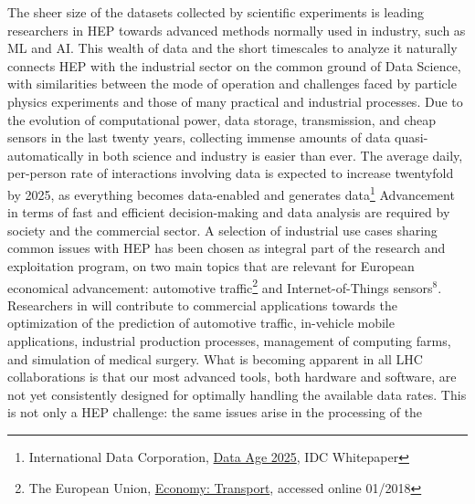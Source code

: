 The sheer size of the datasets collected by
scientific experiments is leading researchers in HEP towards advanced methods normally used in industry,
such as ML and AI. This wealth of data and the short timescales to analyze it
naturally connects HEP with the industrial sector 
on the common ground of Data Science, with similarities between the mode of operation and challenges faced by 
particle physics experiments and those of many practical and industrial processes. 
Due to the evolution of computational power, data storage, transmission, and cheap
sensors in the last twenty years, collecting immense amounts of data
quasi-automatically in both science and industry is easier than ever. 
The average daily, per-person rate of interactions involving data is 
expected to increase twentyfold by 2025, as everything becomes data-enabled
and generates data\footnote{International Data Corporation,
\href{https://www.seagate.com/files/www-content/our-story/trends/files/Seagate-WP-DataAge2025-March-2017.pdf}{Data Age 2025}, IDC Whitepaper}
Advancement in terms of fast and efficient decision-making and data analysis are required by 
society and the commercial sector. A selection of industrial use cases sharing common issues with HEP
has been chosen as integral part of the \acronym research and exploitation program, on two main topics that are
relevant for European economical advancement: automotive traffic\footnote{The European Union, 
\href{https://europa.eu/european-union/about-eu/figures/economy_en}{Economy: Transport}, accessed online 01/2018} and Internet-of-Things sensors$^8$. 
Researchers in \acronym will contribute to commercial applications towards the optimization of  
the prediction of automotive traffic, in-vehicle mobile applications, industrial production processes, 
management of computing farms, and simulation of medical surgery. 
\vskip2pt
What is becoming apparent in all LHC collaborations is that our most advanced tools, both hardware and software,
are not yet consistently designed for optimally handling the available data rates. 
This is not only a HEP challenge: the same issues arise in the processing of the
